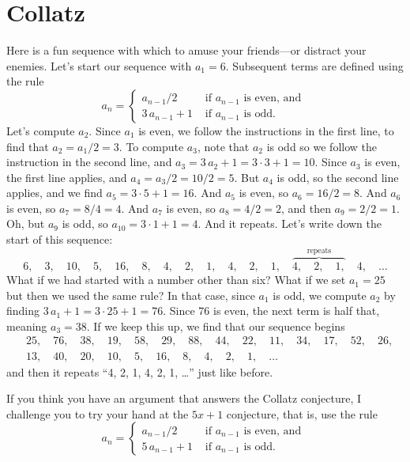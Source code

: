 \documentclass{ximera}
\begin{document}
\section{Collatz}


Here is a fun sequence with which to amuse your friends---or distract
your enemies.  Let's start our sequence with $a_1 = 6$.  Subsequent
terms are defined using the rule
$$
a_n = \begin{cases} a_{n-1} / 2 & \text{ if $a_{n-1}$ is even, and } \\
3 \, a_{n-1} + 1 & \text{ if $a_{n-1}$ is odd.}
\end{cases}
$$
Let's compute $a_2$.  Since $a_1$ is even, we follow the instructions
in the first line, to find that $a_2 = a_1/2 = 3$. To compute $a_3$,
note that $a_2$ is odd so we follow the instruction in the second
line, and $a_3 = 3 \, a_2 + 1 = 3 \cdot 3 + 1 = 10$.  Since $a_3$ is
even, the first line applies, and $a_4 = a_3 / 2 = 10 / 2 = 5$.  But
$a_4$ is odd, so the second line applies, and we find $a_5 = 3 \cdot 5
+ 1 = 16$.  And $a_5$ is even, so $a_6 = 16 / 2 = 8$.  And $a_6$ is
even, so $a_7 = 8/4 = 4$.  And $a_7$ is even, so $a_8 = 4 / 2 = 2$,
and then $a_9 = 2/2 = 1$.  Oh, but $a_9$ is odd, so $a_{10} = 3 \cdot
1 + 1 = 4$.  And it repeats.  Let's write down the start of this sequence:
$$
6,\quad %
3,\quad %
10,\quad  %
5,\quad  %
16,\quad  %
8,\quad  %
4,\quad  %
2,\quad  %
1,\quad  %
4,\quad %
2,\quad %
1,\quad %
\overbrace{4,\quad %
2,\quad %
1,}^{\text{repeats}}\quad %
4,\quad %
\ldots
$$
What if we had started with a number other than six?  What if we set
$a_1 = 25$ but then we used the same rule?  In that case, since $a_1$
is odd, we compute $a_2$ by finding $3 \, a_1 + 1 = 3 \cdot 25 + 1 =
76$.  Since $76$ is even, the next term is half that, meaning $a_3 =
38$.  If we keep this up, we find that our sequence begins
\begin{align*}
&25,\quad 76,\quad 38,\quad 19,\quad 58,\quad 29,\quad 88,\quad 44,\quad 22,\quad 11,\quad 34,\quad 17,\quad 52,\quad 26, \\
&13,\quad 40,\quad 20,\quad 10,\quad 5,\quad 16,\quad 8,\quad 4,\quad 2, \quad 1, \quad \ldots
\end{align*}
and then it repeats ``4, 2, 1, 4, 2, 1, \ldots'' just like before.

If you think you have an argument that answers the Collatz conjecture, I challenge you to try your hand at the $5x+1$ conjecture, that is, use the rule
\[
a_n = \displaystyle\begin{cases} a_{n-1} / 2 & \text{ if $a_{n-1}$ is even, and } \\
5 \, a_{n-1} + 1 & \text{ if $a_{n-1}$ is odd.}
\end{cases}
\]
\end{document}
